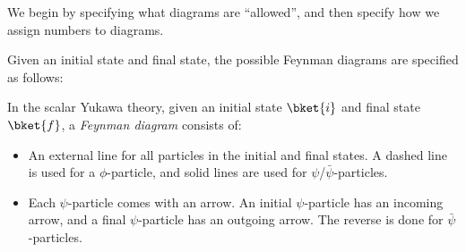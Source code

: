 \documentclass[a4paper]{article}
\begin{document}
We begin by specifying what diagrams are ``allowed'', and then specify how we assign numbers to diagrams.

Given an initial state and final state, the possible Feynman diagrams are specified as follows:
\begin{defi}
  In the scalar Yukawa theory, given an initial state $\bket{i}$ and final state $\bket{f}$, a \emph{Feynman diagram} consists of:
  \begin{itemize}
    \item An external line for all particles in the initial and final states. A dashed line is used for a $\phi$-particle, and solid lines are used for $\psi$/$\bar\psi$-particles.
    \begin{center}
    \end{center}
  \item Each $\psi$-particle comes with an arrow. An initial $\psi$-particle has an incoming arrow, and a final $\psi$-particle has an outgoing arrow. The reverse is done for $\bar\psi$-particles.
    \begin{center}
\end{center}
\end{itemize}
\end{defi}
\end{document}
